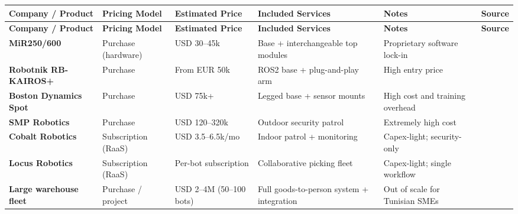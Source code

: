{\small
\setlength{\tabcolsep}{4pt}
\renewcommand{\arraystretch}{1.3}
\begin{longtable}{|>{\raggedright\arraybackslash}m{3.2cm}|
                  >{\raggedright\arraybackslash}m{2.2cm}|
                  >{\raggedright\arraybackslash}m{2.2cm}|
                  >{\raggedright\arraybackslash}m{2.9cm}|
                  >{\raggedright\arraybackslash}m{2.5cm}|
                  >{\centering\arraybackslash}m{1.5cm}|}
\hline
\rowcolor{gray!15}
\textbf{Company / Product} & \textbf{Pricing Model} & \textbf{Estimated Price} & \textbf{Included Services} & \textbf{Notes} & \textbf{Source} \\
\hline
\endfirsthead
\hline
\rowcolor{gray!15}
\textbf{Company / Product} & \textbf{Pricing Model} & \textbf{Estimated Price} & \textbf{Included Services} & \textbf{Notes} & \textbf{Source} \\
\hline
\endhead
\hline
\endfoot
\textbf{MiR250/600} & Purchase (hardware) & USD 30--45k & Base + interchangeable top modules & Proprietary software lock-in & \cite{mir250} \\
\hline
\textbf{Robotnik RB-KAIROS+} & Purchase & From EUR 50k & ROS2 base + plug-and-play arm & High entry price & \cite{robotnik_kairos} \\
\hline
\textbf{Boston Dynamics Spot} & Purchase & USD 75k+ & Legged base + sensor mounts & High cost and training overhead & \cite{standardbots_amr} \\
\hline
\textbf{SMP Robotics} & Purchase & USD 120--320k & Outdoor security patrol & Extremely high cost & \cite{mordor_security} \\
\hline
\textbf{Cobalt Robotics} & Subscription (RaaS) & USD 3.5--6.5k/mo & Indoor patrol + monitoring & Capex-light; security-only & \cite{coherent_security} \\
\hline
\textbf{Locus Robotics} & Subscription (RaaS) & Per-bot subscription & Collaborative picking fleet & Capex-light; single workflow & \cite{builtin_raas} \\
\hline
\textbf{Large warehouse fleet} & Purchase / project & USD 2--4M (50--100 bots) & Full goods-to-person system + integration & Out of scale for Tunisian SMEs & \cite{valuates_agv_amr} \\
\hline
\end{longtable}
}
